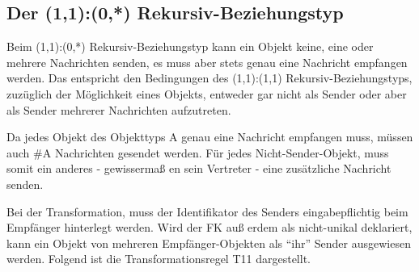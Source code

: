       \subsection{Der (1,1):(0,*) Rekursiv-Beziehungstyp}
        Beim (1,1):(0,*) Rekursiv-Beziehungstyp kann ein Objekt keine, eine oder mehrere Nachrichten senden, es muss aber stets genau eine Nachricht empfangen werden. Das entspricht den Bedingungen des (1,1):(1,1) Rekursiv-Beziehungstyps, zuzüglich der Möglichkeit eines Objekts, entweder gar nicht als Sender oder aber als Sender mehrerer Nachrichten aufzutreten.

        Da jedes Objekt des Objekttyps A genau eine Nachricht empfangen muss, müssen auch \#A Nachrichten gesendet werden. Für jedes Nicht-Sender-Objekt, muss somit ein anderes - gewissermaß en sein Vertreter - eine zusätzliche Nachricht senden.
        \begin{center}
        \end{center}
        Bei der Transformation, muss der Identifikator des Senders eingabepflichtig beim Empfänger hinterlegt werden. Wird der FK auß erdem als nicht-unikal deklariert, kann ein Objekt von mehreren Empfänger-Objekten als \enquote{ihr} Sender ausgewiesen werden. Folgend ist die Transformationsregel T11 dargestellt.
\clearpage
